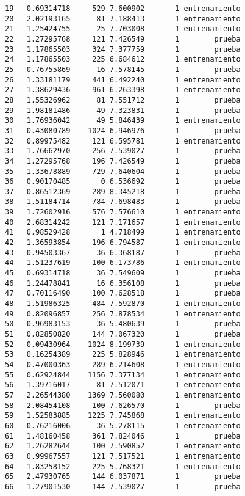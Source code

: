 \documentclass[
  letterpaper,
  DIV=11,
  numbers=noendperiod]{scrreprt}
\begin{document}
\begin{verbatim}
19   0.69314718     529 7.600902       1 entrenamiento
20   2.02193165      81 7.188413       1 entrenamiento
21   1.25424755      25 7.703008       1 entrenamiento
22   1.27295768     121 7.426549       1        prueba
23   1.17865503     324 7.377759       1        prueba
24   1.17865503     225 6.684612       1 entrenamiento
25   0.76755869      16 7.578145       1        prueba
26   1.33181179     441 6.492240       1 entrenamiento
27   1.38629436     961 6.263398       1 entrenamiento
28   1.55326962      81 7.551712       1        prueba
29   1.98181486      49 7.323831       1        prueba
30   1.76936042      49 5.846439       1 entrenamiento
31   0.43080789    1024 6.946976       1        prueba
32   0.89975482     121 6.595781       1 entrenamiento
33   1.76662970     256 7.539027       1        prueba
34   1.27295768     196 7.426549       1        prueba
35   1.33678889     729 7.640604       1        prueba
36   0.90170485       0 6.536692       1        prueba
37   0.86512369     289 8.345218       1        prueba
38   1.51184714     784 7.698483       1        prueba
39   1.72602916     576 7.576610       1 entrenamiento
40   2.68314242     121 7.171657       1 entrenamiento
41   0.98529428       1 4.718499       1 entrenamiento
42   1.36593854     196 6.794587       1 entrenamiento
43   0.94503367      36 6.368187       1        prueba
44   1.51237619     100 6.173786       1 entrenamiento
45   0.69314718      36 7.549609       1        prueba
46   1.24478841      16 6.356108       1        prueba
47   0.70116490     100 7.628518       1        prueba
48   1.51986325     484 7.592870       1 entrenamiento
49   0.82096857     256 7.878534       1 entrenamiento
50   0.96983153      36 5.480639       1        prueba
51   0.82850820     144 7.067320       1        prueba
52   0.09430964    1024 8.199739       1 entrenamiento
53   0.16254389     225 5.828946       1 entrenamiento
54   0.47000363     289 6.214608       1 entrenamiento
55   0.62924844    1156 7.377134       1 entrenamiento
56   1.39716017      81 7.512071       1 entrenamiento
57   2.26544380    1369 7.560080       1 entrenamiento
58   2.08454108     100 7.626570       1        prueba
59   1.52583885    1225 7.745868       1 entrenamiento
60   0.76216006      36 5.278115       1 entrenamiento
61   1.48160458     361 7.824046       1        prueba
62   1.26282644     100 7.590852       1 entrenamiento
63   0.99967557     121 7.517521       1 entrenamiento
64   1.83258152     225 5.768321       1 entrenamiento
65   2.47930765     144 6.037871       1        prueba
66   1.27901530     144 7.539027       1        prueba

\end{verbatim}
\end{document}
